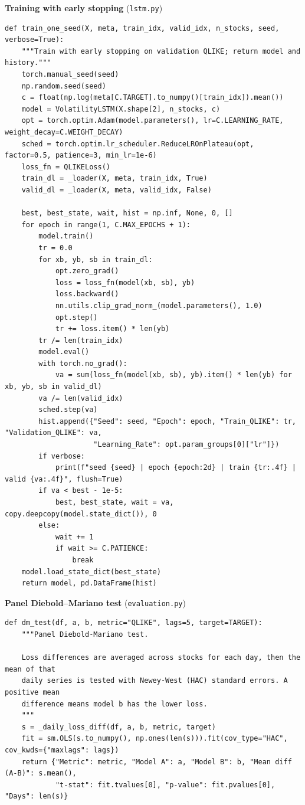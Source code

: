 \documentclass[11pt,a4paper]{article}
\begin{document}
\textbf{Training with early stopping} (\texttt{lstm.py})
\begin{lstlisting}
def train_one_seed(X, meta, train_idx, valid_idx, n_stocks, seed, verbose=True):
    """Train with early stopping on validation QLIKE; return model and history."""
    torch.manual_seed(seed)
    np.random.seed(seed)
    c = float(np.log(meta[C.TARGET].to_numpy()[train_idx]).mean())
    model = VolatilityLSTM(X.shape[2], n_stocks, c)
    opt = torch.optim.Adam(model.parameters(), lr=C.LEARNING_RATE, weight_decay=C.WEIGHT_DECAY)
    sched = torch.optim.lr_scheduler.ReduceLROnPlateau(opt, factor=0.5, patience=3, min_lr=1e-6)
    loss_fn = QLIKELoss()
    train_dl = _loader(X, meta, train_idx, True)
    valid_dl = _loader(X, meta, valid_idx, False)

    best, best_state, wait, hist = np.inf, None, 0, []
    for epoch in range(1, C.MAX_EPOCHS + 1):
        model.train()
        tr = 0.0
        for xb, yb, sb in train_dl:
            opt.zero_grad()
            loss = loss_fn(model(xb, sb), yb)
            loss.backward()
            nn.utils.clip_grad_norm_(model.parameters(), 1.0)
            opt.step()
            tr += loss.item() * len(yb)
        tr /= len(train_idx)
        model.eval()
        with torch.no_grad():
            va = sum(loss_fn(model(xb, sb), yb).item() * len(yb) for xb, yb, sb in valid_dl)
        va /= len(valid_idx)
        sched.step(va)
        hist.append({"Seed": seed, "Epoch": epoch, "Train_QLIKE": tr, "Validation_QLIKE": va,
                     "Learning_Rate": opt.param_groups[0]["lr"]})
        if verbose:
            print(f"seed {seed} | epoch {epoch:2d} | train {tr:.4f} | valid {va:.4f}", flush=True)
        if va < best - 1e-5:
            best, best_state, wait = va, copy.deepcopy(model.state_dict()), 0
        else:
            wait += 1
            if wait >= C.PATIENCE:
                break
    model.load_state_dict(best_state)
    return model, pd.DataFrame(hist)
\end{lstlisting}

\textbf{Panel Diebold--Mariano test} (\texttt{evaluation.py})
\begin{lstlisting}
def dm_test(df, a, b, metric="QLIKE", lags=5, target=TARGET):
    """Panel Diebold-Mariano test.

    Loss differences are averaged across stocks for each day, then the mean of that
    daily series is tested with Newey-West (HAC) standard errors. A positive mean
    difference means model b has the lower loss.
    """
    s = _daily_loss_diff(df, a, b, metric, target)
    fit = sm.OLS(s.to_numpy(), np.ones(len(s))).fit(cov_type="HAC", cov_kwds={"maxlags": lags})
    return {"Metric": metric, "Model A": a, "Model B": b, "Mean diff (A-B)": s.mean(),
            "t-stat": fit.tvalues[0], "p-value": fit.pvalues[0], "Days": len(s)}
\end{lstlisting}
\end{document}

